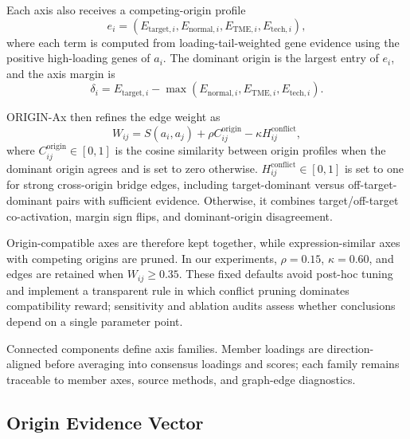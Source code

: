 \documentclass[conference]{IEEEtran}
\begin{document}
Each axis also receives a competing-origin profile
\begin{equation}
e_i=(E_{\mathrm{target},i},E_{\mathrm{normal},i},
E_{\mathrm{TME},i},E_{\mathrm{tech},i}),
\end{equation}
where each term is computed from loading-tail-weighted gene evidence using
the positive high-loading genes of $a_i$. The dominant origin is the largest
entry of $e_i$, and the axis margin is
\[
\delta_i=E_{\mathrm{target},i}
-\max(E_{\mathrm{normal},i},E_{\mathrm{TME},i},E_{\mathrm{tech},i}).
\]

ORIGIN-Ax then refines the edge weight as
\begin{equation}
W_{ij}=S(a_i,a_j)+\rho C^{\mathrm{origin}}_{ij}
-\kappa H^{\mathrm{conflict}}_{ij},
\end{equation}
where $C^{\mathrm{origin}}_{ij}\in[0,1]$ is the cosine similarity between
origin profiles when the dominant origin agrees and is set to zero otherwise.
$H^{\mathrm{conflict}}_{ij}\in[0,1]$ is set to one for strong cross-origin
bridge edges, including target-dominant versus off-target-dominant pairs with
sufficient evidence. Otherwise, it combines target/off-target co-activation,
margin sign flips, and dominant-origin disagreement.

Origin-compatible axes are therefore kept together, while expression-similar
axes with competing origins are pruned. In our experiments,
$\rho=0.15$, $\kappa=0.60$, and edges are retained when $W_{ij}\geq0.35$.
These fixed defaults avoid post-hoc tuning and implement a transparent rule in
which conflict pruning dominates compatibility reward; sensitivity and ablation
audits assess whether conclusions depend on a single parameter point.

Connected components define axis families. Member loadings are direction-aligned
before averaging into consensus loadings and scores; each family remains
traceable to member axes, source methods, and graph-edge diagnostics.

\subsection{Origin Evidence Vector}
\end{document}
